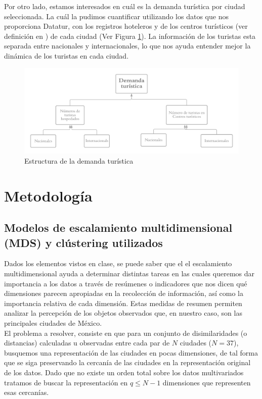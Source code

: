 \documentclass[11pt,letterpaper]{article}
\begin{document}
Por otro lado, estamos interesados en cuál es la demanda turística por ciudad seleccionada. La cuál la pudimos cuantificar utilizando los datos que nos proporciona Datatur, con los registros hoteleros y de los centros turísticos (ver definición en \cite{datatour}) de cada ciudad (Ver Figura \ref{fig:diagrama_demanda}). La información de los turistas esta separada entre nacionales y internacionales, lo que nos ayuda entender mejor la dinámica de los turistas en cada ciudad.
\begin{figure}[H]
    \centering
    \includegraphics[scale=0.3]{figure/diagrama_demanda.png}
    \caption{Estructura de la demanda turística}
    \label{fig:diagrama_demanda}
\end{figure}


\section{Metodología}



\subsection{Modelos de escalamiento multidimensional (MDS) y clústering utilizados}
Dados los elementos vistos en clase, se puede saber que el el escalamiento multidimensional ayuda a determinar distintas tareas en las cuales queremos dar importancia a los datos a través de resúmenes o indicadores que nos dicen qué dimensiones parecen apropiadas en la recolección de información, así como la importancia relativa de cada dimensión. Estas medidas de resumen permiten analizar la percepción de los objetos observados que, en nuestro caso, son las principales ciudades de México.\\

El problema a resolver, consiste en que para un conjunto de disimilaridades (o distancias) calculadas u observadas entre cada par de $N$ ciudades ($N=37$), busquemos una representación de las ciudades en pocas dimensiones, de tal forma que se siga preservando la cercanía de las ciudades en la representación original de los datos. Dado que no existe un orden total sobre los datos multivariados tratamos de buscar la representación en $q\leq N-1$ dimensiones que representen esas cercanías.\\
\end{document}
